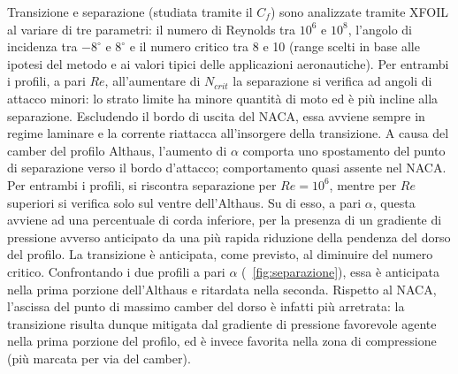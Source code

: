 \documentclass{jfm}
\begin{document}
Transizione e separazione (studiata tramite il $C_f$) sono analizzate tramite XFOIL al variare di tre parametri: il numero di Reynolds tra $10^6$ e $10^8$, l'angolo di incidenza tra $-8^{\circ}$ e $8^{\circ}$ e il numero critico tra 8 e 10 (range scelti in base alle ipotesi del metodo e ai valori tipici delle applicazioni aeronautiche). Per entrambi i profili, a pari $Re$, all'aumentare di $N_{crit}$ la separazione si verifica ad angoli di attacco minori: lo strato limite ha minore quantità di moto ed è più incline alla separazione. Escludendo il bordo di uscita del NACA, essa avviene sempre in regime laminare e la corrente riattacca all'insorgere della transizione. A causa del camber del profilo Althaus, l'aumento di $\alpha$ comporta uno spostamento del punto di separazione verso il bordo d'attacco; comportamento quasi assente nel NACA. Per entrambi i profili, si riscontra separazione per $Re=10^6$, mentre per $Re$ superiori si verifica solo sul ventre dell'Althaus. Su di esso, a pari $\alpha$, questa avviene ad una percentuale di corda inferiore, per la presenza di un gradiente di pressione avverso anticipato da una più rapida riduzione della pendenza del dorso del profilo.
La transizione è anticipata, come previsto, al diminuire del numero critico. Confrontando i due profili a pari $\alpha$ (\figurename \ \ref{fig:separazione}), essa è anticipata nella prima porzione dell'Althaus e ritardata nella seconda. Rispetto al NACA, l'ascissa del punto di massimo camber del dorso è infatti più arretrata: la transizione risulta dunque mitigata dal gradiente di pressione favorevole agente nella prima porzione del profilo, ed è invece favorita nella zona di compressione (più marcata per via del camber).

\end{document}
